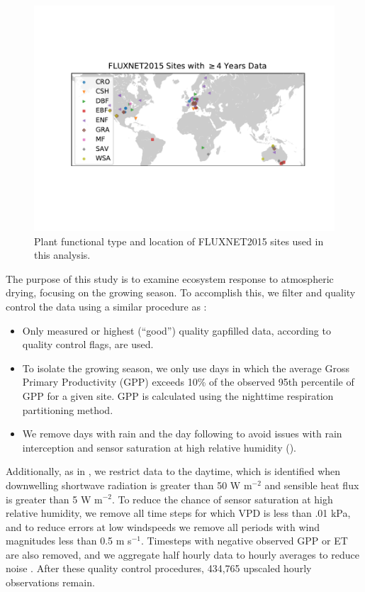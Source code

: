 \documentclass[draft,linenumbers]{agujournal}
\begin{document}
\begin{figure}
  \centering \includegraphics[width=\textwidth]{./map.pdf}
  \caption{Plant functional type and location of FLUXNET2015 sites
    used in this analysis.}
  \label{map_fig}
\end{figure}

The purpose of this study is to examine ecosystem response to
atmospheric drying, focusing on the growing season. To accomplish
this, we filter and quality control the data using a similar procedure
as \cite{Zhou_2015}:
\begin{itemize}
\item Only measured or highest (``good'') quality gapfilled data,
  according to quality control flags, are used.
\item To isolate the growing season, we only use days in which the
  average Gross Primary Productivity (GPP) exceeds 10\% of the
  observed 95th percentile of GPP for a given site. GPP is calculated
  using the nighttime respiration partitioning method.
\item We remove days with rain and the day following to avoid issues
  with rain interception and sensor saturation at high relative
  humidity (\cite{Medlyn_2017}).
\end{itemize}
Additionally, as in \citet{Lin_2018}, we restrict data to the daytime,
which is identified when downwelling shortwave radiation is greater
than 50 W m$^{-2}$ and sensible heat flux is greater than 5 W
m$^{-2}$. To reduce the chance of sensor saturation at high relative
humidity, we remove all time steps for which VPD is less than .01 kPa,
and to reduce errors at low windspeeds we remove all periods with wind
magnitudes less than 0.5 m s$^{-1}$. Timesteps with negative observed
GPP or ET are also removed, and we aggregate half hourly data to
hourly averages to reduce noise \citep{Lin_2018}. After these quality
control procedures, 434,765 upscaled hourly observations remain.
\end{document}
